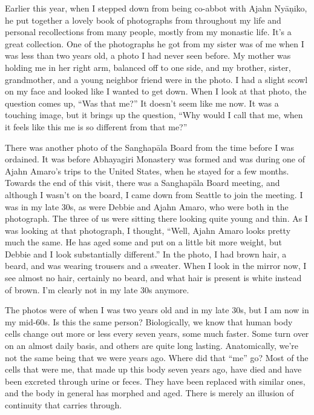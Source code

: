 Earlier this year, when I stepped down from being co-abbot with Ajahn Nyāṇiko, he put together a lovely book of photographs from throughout my life and personal recollections from many people, mostly from my monastic life. It's a great collection. One of the photographs he got from my sister was of me when I was less than two years old, a photo I had never seen before. My mother was holding me in her right arm, balanced off to one side, and my brother, sister, grandmother, and a young neighbor friend were in the photo. I had a slight scowl on my face and looked like I wanted to get down. When I look at that photo, the question comes up, ``Was that me?'' It doesn't seem like me now. It was a touching image, but it brings up the question, ``Why would I call that me, when it feels like this me is so different from that me?''

There was another photo of the Sanghapāla Board from the time before I was ordained. It was before Abhayagiri Monastery was formed and was during one of Ajahn Amaro's trips to the United States, when he stayed for a few months. Towards the end of this visit, there was a Sanghapāla Board meeting, and although I wasn't on the board, I came down from Seattle to join the meeting. I was in my late 30s, as were Debbie and Ajahn Amaro, who were both in the photograph. The three of us were sitting there looking quite young and thin. As I was looking at that photograph, I thought, ``Well, Ajahn Amaro looks pretty much the same. He has aged some and put on a little bit more weight, but Debbie and I look substantially different.'' In the photo, I had brown hair, a beard, and was wearing trousers and a sweater. When I look in the mirror now, I see almost no hair, certainly no beard, and what hair is present is white instead of brown. I'm clearly not in my late 30s anymore.

The photos were of when I was two years old and in my late 30s, but I am now in my mid-60s. Is this the same person? Biologically, we know that human body cells change out more or less every seven years, some much faster. Some turn over on an almost daily basis, and others are quite long lasting. Anatomically, we're not the same being that we were years ago. Where did that ``me'' go? Most of the cells that were me, that made up this body seven years ago, have died and have been excreted through urine or feces. They have been replaced with similar ones, and the body in general has morphed and aged. There is merely an illusion of continuity that carries through.

